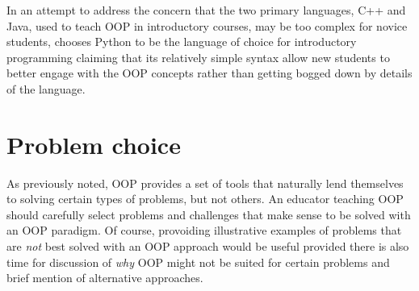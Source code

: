 \documentclass[12pt]{article}
\let\textcite=\autocite
\begin{document}
In an attempt to address the concern that the two primary languages,
C++ and Java, used to teach OOP in introductory courses, may be too
complex for novice students, \textcite{goldwasser_teaching_2008}
chooses Python to be the language of choice for introductory
programming claiming that its relatively simple syntax allow new
students to better engage with the OOP concepts rather than getting
bogged down by details of the language.

\section{Problem choice}
As previously noted, OOP provides a set of tools that naturally lend
themselves to solving certain types of problems, but not others. An
educator teaching OOP should carefully select problems and challenges
that make sense to be solved with an OOP paradigm. Of course,
provoiding illustrative examples of problems that are \emph{not} best
solved with an OOP approach would be useful provided there is also
time for discussion of \emph{why} OOP might not be suited for certain
problems and brief mention of alternative approaches.


\end{document}
